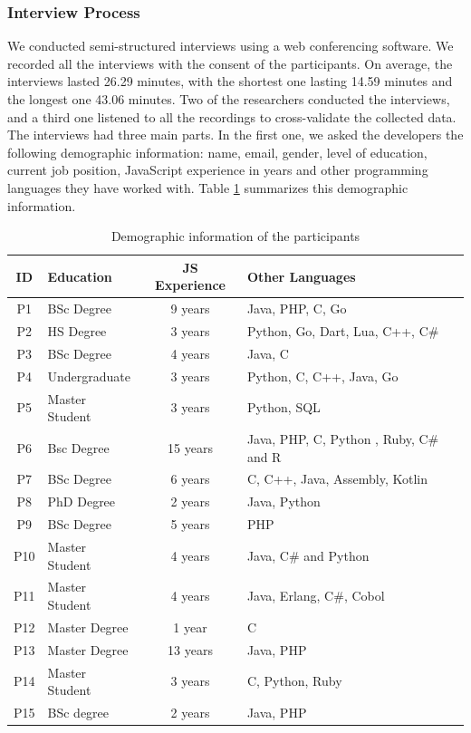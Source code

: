 \subsubsection*{Interview Process} We conducted semi-structured interviews using a web conferencing software. We recorded all the interviews with the consent of the participants. On average, the interviews lasted 26.29 minutes, with the shortest one lasting 14.59 minutes and the longest one 43.06 minutes. 
Two of the researchers conducted the interviews, and a third one listened to all the recordings to cross-validate the collected data.
The interviews had three main parts. In the first one, we asked the developers the following demographic information: name, email, gender, level of education, current job position, JavaScript experience in years and other programming languages they have worked with.
Table \ref{pinterview} summarizes this demographic information.

\begin{table}[htb!]
  \centering
  \caption{Demographic information of the participants}
\begin{scriptsize}  
\begin{tabular}{clcl}
\toprule
ID & Education & JS Experience & Other Languages \\ \midrule 
P1 & BSc Degree & 9 years & Java, PHP, C, Go  
\\ 
P2 & HS Degree & 3 years & Python, Go, Dart, Lua, C++, C\#
\\ 
P3 & BSc Degree & 4 years & Java, C
\\ 
P4 & Undergraduate & 3 years & Python, C, C++, Java, Go
\\ 
P5 & Master Student & 3 years & Python, SQL
\\ 
P6 & Bsc Degree & 15  years  & Java, PHP, C, Python , Ruby, C\# and R
\\ 
P7 & BSc Degree  & 6 years & C, C++, Java, Assembly, Kotlin
\\ 
P8 & PhD Degree & 2 years & Java, Python
\\ 
P9 & BSc Degree  & 5 years & PHP
\\ 
P10 & Master Student & 4 years & Java, C\# and Python
\\ 
P11 & Master Student & 4 years & Java, Erlang, C\#, Cobol
\\ 
P12 & Master Degree & 1 year & C
\\ 
P13 & Master Degree & 13 years & Java, PHP
\\ 
P14 & Master Student & 3 years & C, Python, Ruby
\\ 
P15 &  BSc degree  & 2 years & Java, PHP
\\ \bottomrule
\end{tabular}
\end{scriptsize}
    \label{pinterview}
\end{table}

